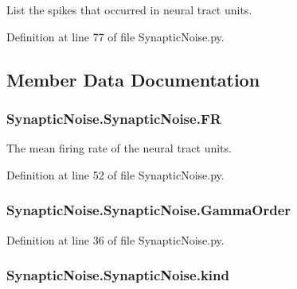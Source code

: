 List the spikes that occurred in neural tract units. 



Definition at line 77 of file Synaptic\+Noise.\+py.



\subsection{Member Data Documentation}
\subsubsection[{\texorpdfstring{FR}{FR}}]{\setlength{\rightskip}{0pt plus 5cm}Synaptic\+Noise.\+Synaptic\+Noise.\+FR}\hypertarget{class_synaptic_noise_1_1_synaptic_noise_af74066a527ea667c2e6cdd771391b29c}{}\label{class_synaptic_noise_1_1_synaptic_noise_af74066a527ea667c2e6cdd771391b29c}


The mean firing rate of the neural tract units. 



Definition at line 52 of file Synaptic\+Noise.\+py.

\subsubsection[{\texorpdfstring{Gamma\+Order}{GammaOrder}}]{\setlength{\rightskip}{0pt plus 5cm}Synaptic\+Noise.\+Synaptic\+Noise.\+Gamma\+Order}\hypertarget{class_synaptic_noise_1_1_synaptic_noise_ade79c5746b21fe7702e5f29a7f7b2894}{}\label{class_synaptic_noise_1_1_synaptic_noise_ade79c5746b21fe7702e5f29a7f7b2894}


Definition at line 36 of file Synaptic\+Noise.\+py.

\subsubsection[{\texorpdfstring{kind}{kind}}]{\setlength{\rightskip}{0pt plus 5cm}Synaptic\+Noise.\+Synaptic\+Noise.\+kind}\hypertarget{class_synaptic_noise_1_1_synaptic_noise_a06c7bc38c4b3794340171dfa91edf5d8}{}\label{class_synaptic_noise_1_1_synaptic_noise_a06c7bc38c4b3794340171dfa91edf5d8}


